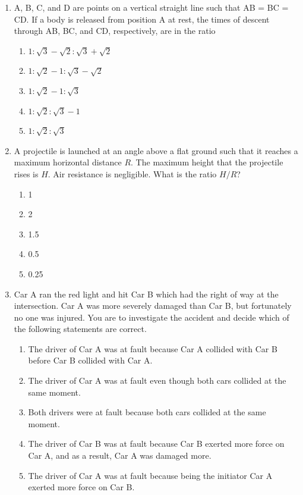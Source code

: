 \documentclass[12pt,letterpaper]{article}
\begin{document}
\begin{enumerate}
\item
A, B, C, and D are points on a vertical straight line such that AB = BC = CD. If a body is released from position A at rest, the times of descent through AB, BC, and CD, respectively, are in the ratio
\begin{enumerate}
\item $1:\sqrt{3}-\sqrt{2}:\sqrt{3}+\sqrt{2}$
\item $1:\sqrt{2}-1:\sqrt{3}-\sqrt{2}$
\item $1:\sqrt{2}-1:\sqrt{3}$
\item $1:\sqrt{2}:\sqrt{3}-1$
\item $1:\sqrt{2}:\sqrt{3}$
\end{enumerate}

\item
A projectile is launched at an angle above a flat ground such that it reaches a maximum horizontal distance $R$. The maximum height that the projectile rises is $H$. Air resistance is negligible. What is the ratio $H/R$?
\begin{enumerate}
\item 1
\item 2
\item 1.5
\item 0.5
\item 0.25
\end{enumerate}

\item
Car A ran the red light and hit Car B which had the right of way at the intersection. Car A was more severely damaged than Car B, but fortunately no one was injured. You are to investigate the accident and decide which of the following statements are correct.
\begin{enumerate}
\item The driver of Car A was at fault because Car A collided with Car B before Car B collided with Car A.
\item The driver of Car A was at fault even though both cars collided at the same moment.
\item Both drivers were at fault because both cars collided at the same moment.
\item The driver of Car B was at fault because Car B exerted more force on Car A, and as a result, Car A was damaged more.
\item The driver of Car A was at fault because being the initiator Car A exerted more force on Car B.
\end{enumerate}


\end{enumerate}
\end{document}
